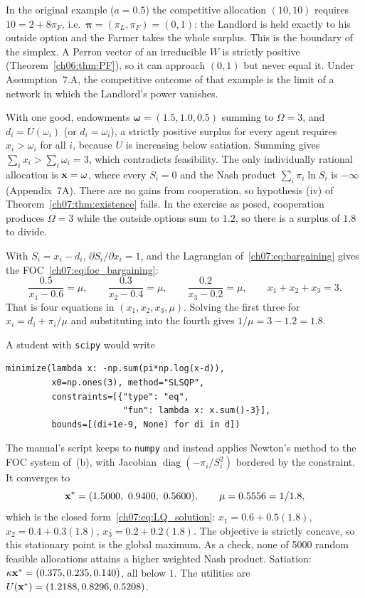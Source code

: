 \documentclass[../solutions_manual.tex]{subfiles}
\begin{document}
In the original example ($a = 0.5$) the competitive allocation $(10, 10)$ requires $10 = 2 + 8\pi_F$, i.e.\ $\boldsymbol{\pi} = (\pi_L, \pi_F) = (0, 1)$: the Landlord is held exactly to his outside option and the Farmer takes the whole surplus. This is the boundary of the simplex. A Perron vector of an irreducible $W$ is strictly positive (Theorem~\ref{ch06:thm:PF}), so it can approach $(0,1)$ but never equal it. Under Assumption~7.A, the competitive outcome of that example is the limit of a network in which the Landlord's power vanishes.


 With one good, endowments $\boldsymbol{\omega} = (1.5, 1.0, 0.5)$ summing to $\Omega = 3$, and $d_i = U(\omega_i)$ (or $d_i = \omega_i$), a strictly positive surplus for every agent requires $x_i > \omega_i$ for all $i$, because $U$ is increasing below satiation. Summing gives $\sum_i x_i > \sum_i\omega_i = 3$, which contradicts feasibility. The only individually rational allocation is $\mathbf{x} = \omega$, where every $S_i = 0$ and the Nash product $\sum_i\pi_i\ln S_i$ is $-\infty$ (Appendix~7A). There are no gains from cooperation, so hypothesis (iv) of Theorem~\ref{ch07:thm:existence} fails. In the exercise as posed, cooperation produces $\Omega = 3$ while the outside options sum to $1.2$, so there is a surplus of $1.8$ to divide.

 With $S_i = x_i - d_i$, $\partial S_i/\partial x_i = 1$, and the Lagrangian of~\eqref{ch07:eq:bargaining} gives the FOC~\eqref{ch07:eq:foc_bargaining}:
\[
\frac{0.5}{x_1 - 0.6} = \mu, \qquad \frac{0.3}{x_2 - 0.4} = \mu, \qquad \frac{0.2}{x_3 - 0.2} = \mu, \qquad x_1 + x_2 + x_3 = 3 .
\]
That is four equations in $(x_1, x_2, x_3, \mu)$. Solving the first three for $x_i = d_i + \pi_i/\mu$ and substituting into the fourth gives $1/\mu = 3 - 1.2 = 1.8$.

 A student with \texttt{scipy} would write
\begin{verbatim}
minimize(lambda x: -np.sum(pi*np.log(x-d)),
         x0=np.ones(3), method="SLSQP",
         constraints=[{"type": "eq",
                       "fun": lambda x: x.sum()-3}],
         bounds=[(di+1e-9, None) for di in d])
\end{verbatim}
The manual's script keeps to \texttt{numpy} and instead applies Newton's method to the FOC system of~(b), with Jacobian $\operatorname{diag}(-\pi_i/S_i^2)$ bordered by the constraint. It converges to
\[
\mathbf{x}^* = (1.5000,\ 0.9400,\ 0.5600), \qquad \mu = 0.5556 = 1/1.8,
\]
which is the closed form~\eqref{ch07:eq:LQ_solution}: $x_1 = 0.6 + 0.5(1.8)$, $x_2 = 0.4 + 0.3(1.8)$, $x_3 = 0.2 + 0.2(1.8)$. The objective is strictly concave, so this stationary point is the global maximum. As a check, none of 5000 random feasible allocations attains a higher weighted Nash product. Satiation: $\kappa\mathbf{x}^* = (0.375, 0.235, 0.140)$, all below $1$. The utilities are $U(\mathbf{x}^*) = (1.2188, 0.8296, 0.5208)$.
\end{document}
